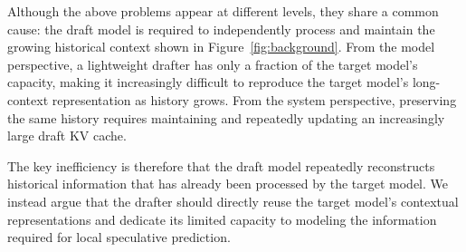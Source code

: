 
Although the above problems appear at different levels, they share a common cause: the draft model is required to independently process and maintain the growing historical context shown in Figure~\ref{fig:background}. From the model perspective, a lightweight drafter has only a fraction of the target model's capacity, making it increasingly difficult to reproduce the target model's long-context representation as history grows. From the system perspective, preserving the same history requires maintaining and repeatedly updating an increasingly large draft KV cache.

The key inefficiency is therefore that the draft model repeatedly reconstructs historical information that has already been processed by the target model. We instead argue that the drafter should directly reuse the target model's contextual representations and dedicate its limited capacity to modeling the information required for local speculative prediction. 
